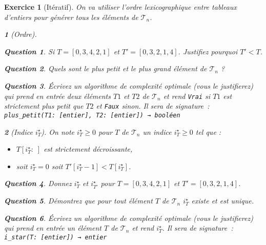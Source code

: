 \documentclass{article}
\theoremstyle{exostyle}
\newtheorem{exo}{Exercice}
\theoremstyle{partiestyle}
\newtheorem{partie}{}[exo]
\theoremstyle{questionstyle}
\newtheorem{questionpartie}{Question}[partie]
\begin{document}
\begin{exo}[Itératif]
    On va utiliser l'ordre lexicographique entre tableaux d'entiers pour générer tous les éléments de $\mathcal{T}_n$. 
    \begin{partie}[Ordre]
        \begin{questionpartie}
            Si $T = [0, 3, 4, 2, 1]$ et $T' = [0, 3, 2, 1 ,4]$. Justifiez pourquoi $T' < T$.
        \end{questionpartie}
        \begin{questionpartie}
            Quels sont le plus petit et le plus grand élément de $\mathcal{T}_n$ ?
        \end{questionpartie}
        \begin{questionpartie}
            Écrivez un algorithme de complexité optimale (vous le justifierez) qui prend en entrée deux éléments $T1$ et $T2$ de $\mathcal{T}_n$ et rend \verb|Vrai| si $T1$ est strictement plus petit que $T2$ et \verb|Faux| sinon. Il sera de signature~:
              \verb|plus_petit(T1: [entier], T2: [entier]) → booléen| 
        \end{questionpartie}
    \end{partie}
    \begin{partie}[Indice $i^\star_{T}$]
        On note $i^\star_{T}\geq 0$ pour $T$ de $\mathcal{T}_n$ un indice $i^\star_{T}\geq 0$ tel que :
        \begin{itemize}
            \item $T[i^\star_{T}:\;]$ est strictement décroissante,
            \item soit $i^\star_{T}=0$ soit $T'[i^\star_{T}-1] < T[i^\star_{T}]$.
        \end{itemize}
        \begin{questionpartie}
            Donnez $i^\star_{T}$ et $i^\star_{T'}$ pour $T = [0, 3, 4, 2, 1]$ et $T' = [0, 3, 2, 1 ,4]$.
        \end{questionpartie}
        \begin{questionpartie}
            Démontrez que pour tout élément $T$ de $\mathcal{T}_n$ $i^\star_{T}$ existe et est unique.
        \end{questionpartie}
        \begin{questionpartie}
            Écrivez un algorithme de complexité optimale (vous le justifierez) qui prend en entrée un élément $T$ de $\mathcal{T}_n$ et rend $i^\star_{T}$. Il sera de signature~:
              \verb|i_star(T: [entier]) → entier| 
        \end{questionpartie}

\end{partie}
\end{exo}
\end{document}
